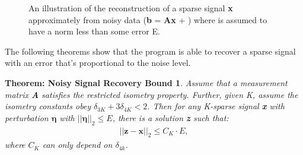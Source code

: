 \documentclass[titlepage,oneside, 12pt]{book}
\theoremstyle{break}
\begin{document}
\begin{figure}[t]
\centering
{}

\caption{An illustration of the reconstruction of a sparse signal \textbf{x} approximately from noisy data (\textbf{b} = \textbf{Ax} + \pmb{$\eta$}) where \pmb{$\eta$} is assumed to have a norm less than some error E.}
\label{fig:L1NoiseTik}

\end{figure}

The following theorems show that the program is able to recover a sparse signal with an error that's proportional to the noise level\cite{SSR}.

\newpage

\newtheorem*{Stab}{Theorem: Noisy Signal Recovery Bound}
\begin{Stab}
Assume that a measurement matrix \textbf{A} satisfies the restricted isometry property.  Further, given K, assume the isometry constants obey $\delta_{3K} + 3\delta_{4K} < 2$. Then for any K-sparse signal \textbf{x} with perturbation  $\pmb{\eta}$ with $||\pmb{\eta}||_2 \leq E$, there is a solution \textbf{z} such that: 
\begin{equation}
\begin{gathered}
||\textbf{z} - \textbf{x}||_2 \leq C_K \cdot E, 
\end{gathered}
\label{eqn:NSRB}
\end{equation}
where $C_K$ can only depend on $\delta_{4k}$. 
\end{Stab}
\end{document}
